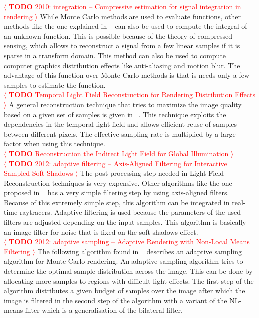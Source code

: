 \documentclass[review]{acmsiggraph}
\newcommand{\todo}[1]{\textcolor{red}{\(\langle\) \textbf{TODO} #1 \(\rangle\) }}
\begin{document}
\todo{2010: integration -- Compressive estimation for signal integration in rendering}
While Monte Carlo methods are used to evaluate functions, 
other methods like the one explained in ~\cite{Sen:CompressiveSignalEstimation:2010} can also be used to compute the integral of an unknown function.
This is possible because of the theory of compressed sensing, which allows to reconstruct a signal from a few linear samples if it is sparse in a transform domain.
This method can also be used to compute computer graphics distribution effects like anti-aliasing and motion blur.
The advantage of this function over Monte Carlo methods is that is needs only a few samples to estimate the function.
\\
\todo{Temporal Light Field Reconstruction for Rendering Distribution Effects}
A general reconstruction technique that tries to maximize the image quality based on a given set of samples is given in ~\cite{Lehtinen2011sg}.
This technique exploits the dependencies in the temporal light field and allows efficient reuse of samples between different pixels.
The effective sampling rate is multiplied by a large factor when using this technique.
\\
\todo{Reconstruction the Indirect Light Field for Global Illumination}
\\
\todo{2012: adaptive filtering -- Axis-Aligned Filtering for Interactive Sampled Soft Shadows}
The post-processing step needed in Light Field Reconstruction techniques is very expensive.
Other algorithms like the one proposed in ~\cite{UdayMehta:2012:AAF} has a very simple filtering step by using axis-aligned filters.
Because of this extremely simple step, this algorithm can be integrated in real-time raytracers.
Adaptive filtering is used because the parameters of the used filters are adjusted depending on the input samples.
This algorithm is basically an image filter for noise that is fixed on the soft shadows effect.
\\
\todo{2012: adaptive sampling -- Adaptive Rendering with Non-Local Means Filtering}
The following algorithm found in ~\cite{Rousselle:2012:ARN:2366145.2366214} describes an adaptive sampling algorithm for Monte Carlo rendering.
An adaptive sampling algorithm tries to determine the optimal sample distribution across the image.
This can be done by allocating more samples to regions with difficult light effects.
The first step of the algorithm distributes a given budget of samples over the image after which the image is filtered in the second step of the algorithm with a variant of the NL-means filter which is a generalisation of the bilateral filter.
\end{document}
